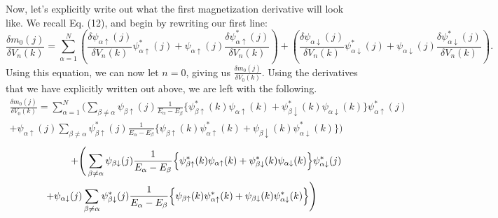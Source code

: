 \documentclass[10pt]{revtex4-1}
\newcommand{\ua}{\uparrow}
\newcommand{\da}{\downarrow}
\newcommand{\paup}{{\psi_{\alpha \ua}}}
\newcommand{\padn}{{\psi_{\alpha \da}}}
\newcommand{\pbup}{{\psi_{\beta \ua}}}
\newcommand{\pbdn}{{\psi_{\beta \da}}}
\newcommand{\paups}{{\psi_{\alpha \ua}^*}}
\newcommand{\padns}{{\psi_{\alpha \da}^*}}
\newcommand{\pbups}{{\psi_{\beta \ua}^*}}
\newcommand{\pbdns}{{\psi_{\beta \da}^*}}
\begin{document}
Now, let's explicitly write out what the first magnetization derivative will look like.
We recall Eq. (12), and begin by rewriting our first line:
\begin{equation*}
  \frac{\delta m_0(j)}{\delta V_n(k)} = \sum_{\alpha = 1}^N
  \left(\frac{\delta \psi_{\alpha \ua}(j)}{\delta V_n(k)} \psi_{\alpha \ua}^*(j) + \psi_{\alpha \ua}(j) \frac{\delta \psi_{\alpha \ua}^*(j)}{\delta V_n(k)}\right) + \left(\frac{\delta \psi_{\alpha \da}(j)}{\delta V_n(k)} \psi_{\alpha \da}^*(j) + \psi_{\alpha \da}(j) \frac{\delta \psi_{\alpha \da}^*(j)}{\delta V_n(k)}\right) .
\end{equation*}
Using this equation, we can now let $n=0$, giving us $\frac{\delta m_0(j)}{\delta V_0(k)}$.
Using the derivatives that we have explicitly written out above, we are left with the following.
\begin{multline*}
  \frac{\delta m_0(j)}{\delta V_0(k)}= \sum_{\alpha = 1}^N
  \Bigg( \sum_{\beta \neq \alpha} \pbup(j) \frac{1}{E_{\alpha}-E_{\beta}} \Big\{ \pbups(k) \paup(k) + \pbdns(k) \padn(k) \Big\} \paups(j) \\ +
  \paup(j) \sum_{\beta \neq \alpha} \pbups(j) \frac{1}{E_{\alpha}-E_{\beta}} \Big\{ \pbup(k) \paups(k) + \pbdn(k) \padns(k) \Big\} \Bigg)
\end{multline*}
\begin{multline*}
  \hspace{1.75cm}
  + \Bigg( \sum_{\beta \neq \alpha} \pbdn(j) \frac{1}{E_{\alpha}-E_{\beta}} \Big\{ \pbups(k) \paup(k) + \pbdns(k) \padn(k) \Big\} \padns(j)
  \\ +
  \padn(j) \sum_{\beta \neq \alpha}\pbdns(j) \frac{1}{E_{\alpha}-E_{\beta}} \Big\{ \pbup(k) \paups(k) + \pbdn(k) \padns(k) \Big\} \Bigg)
\end{multline*}
\end{document}
